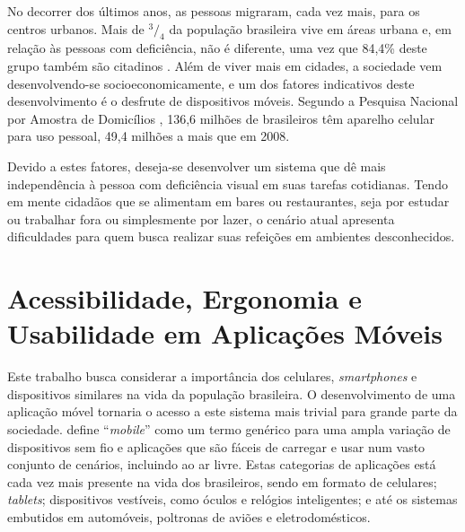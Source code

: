 No decorrer dos últimos anos, as pessoas migraram, cada vez mais, para os centros urbanos. Mais de $^3/_4$ da população brasileira vive em áreas urbana \cite{IBGE2011} e, em relação às pessoas com deficiência, não é diferente, uma vez que 84,4\% deste grupo também são citadinos \cite{IBGE2010}. Além de viver mais em cidades, a sociedade vem desenvolvendo-se socioeconomicamente, e um dos fatores indicativos deste desenvolvimento é o desfrute de dispositivos móveis. Segundo a Pesquisa Nacional por Amostra de Domicílios \cite{PNAD2014}, 136,6 milhões de brasileiros têm aparelho celular para uso pessoal, 49,4 milhões a mais que em 2008. 

Devido a estes fatores, deseja-se desenvolver um sistema que dê mais independência à pessoa com deficiência visual em suas tarefas cotidianas. Tendo em mente cidadãos que se alimentam em bares ou restaurantes, seja por estudar ou trabalhar fora ou simplesmente por lazer, o cenário atual apresenta dificuldades para quem busca realizar suas refeições em ambientes desconhecidos. 

\section{\label{sec:acessibilidade}Acessibilidade, Ergonomia e Usabilidade em Aplicações Móveis}
Este trabalho busca considerar a importância dos celulares, \emph{smartphones} e dispositivos similares na vida da população brasileira. O desenvolvimento de uma aplicação móvel tornaria o acesso a este sistema mais trivial para grande parte da sociedade. \cite{WCAG20} define “\emph{mobile}” como um termo genérico para uma ampla variação de dispositivos sem fio e aplicações que são fáceis de carregar e usar num vasto conjunto de cenários, incluindo ao ar livre. Estas categorias de aplicações está cada vez mais presente na vida dos brasileiros, sendo em formato de celulares; \emph{tablets}; dispositivos vestíveis, como óculos e relógios inteligentes; e até os sistemas embutidos em automóveis, poltronas de aviões e eletrodomésticos.

